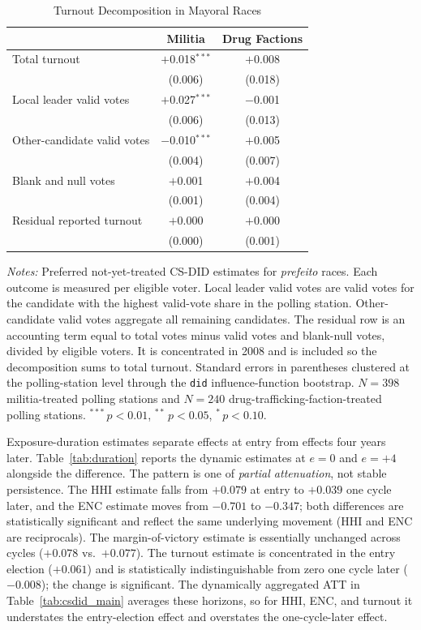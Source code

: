 \documentclass[11pt]{article}
\newcommand{\tabnotes}[1]{\par\vspace{3pt}\noindent\begin{minipage}{\linewidth}\footnotesize #1\end{minipage}}
\begin{document}
\begin{table}[H]
\centering
\caption{Turnout Decomposition in Mayoral Races}\label{tab:turnout_decomp}
\footnotesize
\begin{tabular}{@{}lcc@{}}
\toprule
 & \textbf{Militia} & \textbf{Drug Factions} \\
\midrule
Total turnout                  & $+$0.018$^{***}$ & $+$0.008 \\
                               & (0.006)          & (0.018) \\
Local leader valid votes        & $+$0.027$^{***}$ & $-$0.001 \\
                               & (0.006)          & (0.013) \\
Other-candidate valid votes     & $-$0.010$^{***}$ & $+$0.005 \\
                               & (0.004)          & (0.007) \\
Blank and null votes            & $+$0.001         & $+$0.004 \\
                               & (0.001)          & (0.004) \\
Residual reported turnout       & $+$0.000         & $+$0.000 \\
                               & (0.000)          & (0.001) \\
\bottomrule
\end{tabular}
\tabnotes{\textit{Notes:} Preferred not-yet-treated CS-DID estimates for \emph{prefeito} races. Each outcome is measured per eligible voter. Local leader valid votes are valid votes for the candidate with the highest valid-vote share in the polling station. Other-candidate valid votes aggregate all remaining candidates. The residual row is an accounting term equal to total votes minus valid votes and blank-null votes, divided by eligible voters. It is concentrated in 2008 and is included so the decomposition sums to total turnout. Standard errors in parentheses clustered at the polling-station level through the \texttt{did} influence-function bootstrap. $N=398$ militia-treated polling stations and $N=240$ drug-trafficking-faction-treated polling stations. $^{***}\,p<0.01$, $^{**}\,p<0.05$, $^{*}\,p<0.10$.}
\end{table}

Exposure-duration estimates separate effects at entry from effects four years later. Table~\ref{tab:duration} reports the dynamic estimates at $e=0$ and $e=+4$ alongside the difference. The pattern is one of \emph{partial attenuation}, not stable persistence. The HHI estimate falls from $+0.079$ at entry to $+0.039$ one cycle later, and the ENC estimate moves from $-0.701$ to $-0.347$; both differences are statistically significant and reflect the same underlying movement (HHI and ENC are reciprocals). The margin-of-victory estimate is essentially unchanged across cycles ($+0.078$ vs.\ $+0.077$). The turnout estimate is concentrated in the entry election ($+0.061$) and is statistically indistinguishable from zero one cycle later ($-0.008$); the change is significant. The dynamically aggregated ATT in Table~\ref{tab:csdid_main} averages these horizons, so for HHI, ENC, and turnout it understates the entry-election effect and overstates the one-cycle-later effect.
\end{document}
